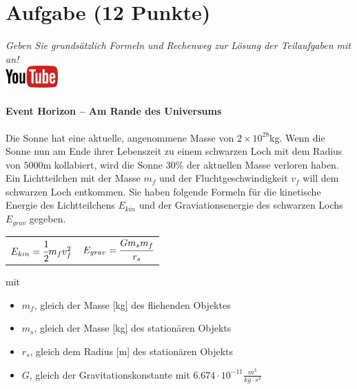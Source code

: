 \documentclass[a4paper, 10pt]{scrartcl}\usepackage[]{graphicx}\usepackage[]{xcolor}
\begin{document}
\clearpage\null 
\clearpage

\section{Aufgabe \hfill (12 Punkte)}

\textit{Geben Sie grunds{\"a}tzlich Formeln und Rechenweg zur L{\"o}sung der
  Teilaufgaben mit an!} \\[1Ex]

\hfill\href{https://youtu.be/q-qYK4Chslg}{\includegraphics[width =
  2cm]{img/youtube}} %
\hspace{2Ex}

\paragraph{Event Horizon -- Am Rande des Universums}



Die Sonne hat eine aktuelle, angenommene Masse von
$\ensuremath{2\times 10^{28}}$kg. Wenn die Sonne nun am Ende ihrer Lebenszeit zu einem schwarzen Loch mit dem Radius
von $5000$m kollabiert, wird
die Sonne $30$\% der aktuellen Masse verloren haben. Ein
Lichtteilchen mit der Masse $m_f$ und der Fluchtgeschwindigkeit $v_f$ will
dem schwarzen Loch entkommen.  Sie haben folgende Formeln f{\"u}r die
kinetische Energie des Lichtteilchens $E_{kin}$ und der Graviationsenergie des
schwarzen Lochs $E_{grav}$ gegeben.

\begin{center}
  \begin{tabular}{cc}
    $E_{kin} = \cfrac{1}{2}m_fv_f^2$ & $E_{grav} = \cfrac{Gm_sm_f}{r_s}$\\
  \end{tabular}
\end{center}

mit

\begin{itemize}
\item $m_f$, gleich der Masse [kg] des fliehenden Objektes
\item $m_s$, gleich der Masse [kg] des station{\"a}ren Objekts
\item $r_s$, gleich dem Radius [m] des station{\"a}ren Objekts  
\item $G$, gleich der Gravitationskonstante mit $6.674 \cdot 10^{-11}
  \tfrac{m^3}{kg \cdot s^2}$ 
\end{itemize}
\end{document}
